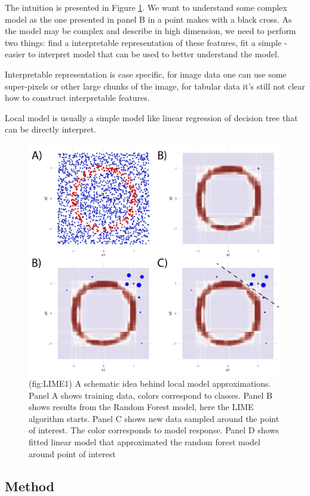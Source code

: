 \documentclass[12pt,]{krantz}
\theoremstyle{definition}
\theoremstyle{definition}
\theoremstyle{definition}
\theoremstyle{remark}
\begin{document}
The intuition is presented in Figure \ref{fig:LIME1}. We want to
understand some complex model as the one presented in panel B in a point
makes with a black cross. As the model may be complex and describe in
high dimension, we need to perform two things: find a interpretable
representation of these features, fit a simple - easier to interpret
model that can be used to better understand the model.

Interpretable representation is case specific, for image data one can
use some super-pixels or other large chunks of the image, for tabular
data it's still not clear how to construct interpretable features.

Local model is usually a simple model like linear regression of decision
tree that can be directly interpret.

\begin{figure}

{\centering \includegraphics[width=0.7\linewidth]{figure/circle_4panels} 

}

\caption{(fig:LIME1) A schematic idea behind local model approximations. Panel A shows training data, colors correspond to classes. Panel B shows results from the Random Forest model, here the LIME algorithm starts. Panel C shows new data sampled around the point of interest. The color corresponds to model response. Panel D shows fitted linear model that approximated the random forest model around point of interest}\label{fig:LIME1}
\end{figure}

\hypertarget{method-3}{%
\subsection{Method}\label{method-3}}
\end{document}
